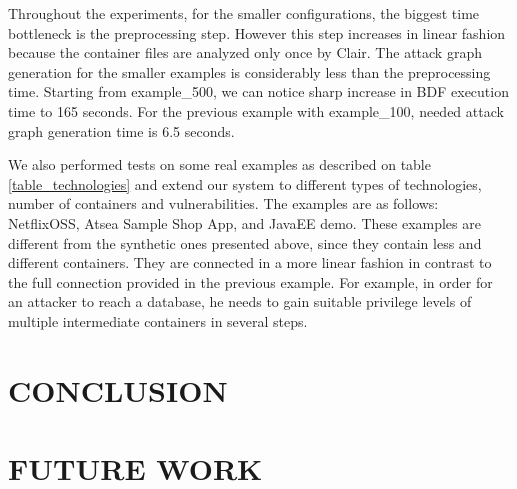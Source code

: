 \documentclass[letterpaper, 10 pt, conference]{ieeeconf}  %
\begin{document}
Throughout the experiments, for the smaller configurations, the biggest time bottleneck is the preprocessing step. However this step increases in linear fashion because the container files are analyzed only once by Clair. The attack graph generation for the smaller examples is considerably less than the preprocessing time. Starting from example\_500, we can notice sharp increase in BDF execution time to 165 seconds. For the previous example with example\_100, needed attack graph generation time is 6.5 seconds.

We also performed tests on some real examples as described on table \ref{table_technologies} and extend our system to different types of technologies, number of containers and vulnerabilities. The examples are as follows: NetflixOSS, Atsea Sample Shop App, and JavaEE demo. These examples are different from the synthetic ones presented above, since they contain less and different containers. They are connected in a more linear fashion in contrast to the full connection provided in the previous example. For example, in order for an attacker to reach a database, he needs to gain suitable privilege levels of multiple intermediate containers in several steps.



\section{CONCLUSION}

\section{FUTURE WORK}


\addtolength{\textheight}{-12cm}   %




\end{document}
